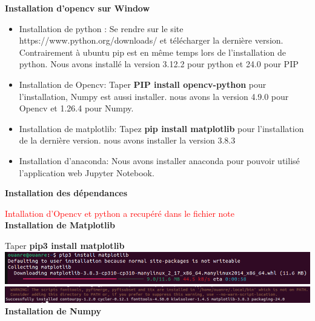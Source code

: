 \documentclass[12pt,a4paper]{report}
\begin{document}
\textbf{Installation d'opencv sur Window}

\begin{itemize}
	
	\item Installation de python : Se rendre sur le site https://www.python.org/downloads/ et télécharger la dernière version. Contrairement à ubuntu pip est en même temps lors de l'installation de python. Nous avons installé la version 3.12.2 pour python et 24.0 pour PIP\\
	
	\item Installation de Opencv: Taper \textbf{PIP install opencv-python} pour l'installation, Numpy est aussi installer. nous avons la version 4.9.0 pour Opencv et 1.26.4 pour Numpy.
	
	\item Installation de matplotlib: Tapez \textbf{pip install matplotlib} pour l'installation de la dernière version. nous avons installer la version 3.8.3
	
	\item Installation d'anaconda: Nous avons installer anaconda pour pouvoir utilisé l'application web Jupyter Notebook.\\
	   
\end{itemize}


\begin{center}
\textbf{Installation des dépendances}	
\end{center}


\textcolor{red}{Intallation d'Opencv et python a recupéré dans le fichier note}\\

\textbf{Installation de Matplotlib \\}

Taper \textbf{pip3 install matplotlib} \\

\includegraphics[scale=0.5]{image/instalation de matplotlib1.png} \\

\includegraphics[scale=0.40]{image/installation de matplotlib2.png}\\

\textbf{Installation de Numpy}




 

















\newpage


\end{document}
